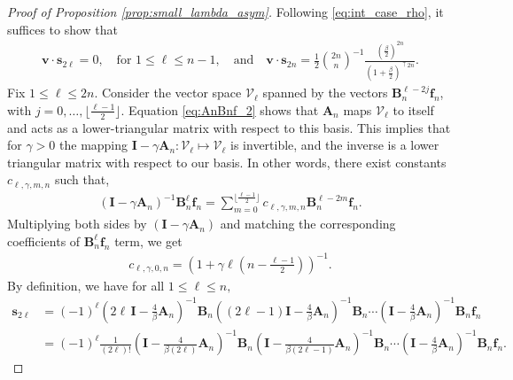 \documentclass[12pt]{article}
\theoremstyle{definition} %
\theoremstyle{remark} %
\begin{document}
\begin{proof}[Proof of Proposition \ref{prop:small_lambda_asym}]
    Following \eqref{eq:int_case_rho}, it suffices to show that
     \begin{align}
         \mathbf{v}\cdot\mathbf{s}_{2\ell}=0,\quad \text{for $1\le \ell\le n-1$},\quad\text{and} \quad 
         \mathbf{v}\cdot\mathbf{s}_{2n}=   \frac12 \binom{2n}{n}^{-1}\frac{\left(\tfrac{\beta}{2}\right)^{2n}}{\left(1+\frac{\beta}{2}\right)^{\uparrow 2n}}.
     \end{align}
Fix $1\le \ell\le 2n$. Consider the vector space $\mathcal{V}_\ell$ spanned by the vectors $\mathbf{B}_n^{\ell-2j}\mathbf{f}_n$, with $j=0,\dots,  \lfloor\frac{\ell-1}{2}\rfloor$.
Equation \eqref{eq:AnBnf_2} shows that $\mathbf{A}_n$ maps $\mathcal{V}_\ell$ to itself and acts as a lower-triangular matrix with respect to this basis. This implies that for $\gamma>0$ the mapping $\mathbf{I}-\gamma \mathbf{A}_n: \mathcal{V}_\ell \mapsto \mathcal{V}_\ell$ is invertible, and the inverse is a lower triangular matrix with respect to our basis. 
In other words, there exist constants $ c_{\ell,\gamma, m, n} $ such that,
\begin{align}
    \label{eq:invBnf}
    (\mathbf{I}-\gamma \mathbf{A}_n)^{-1}   \mathbf{B}^{\ell}_n   \mathbf{f}_n = \sum_{m=0}^{\lfloor \frac{\ell-1}{2} \rfloor} c_{\ell,\gamma, m, n}  \mathbf{B}^{\ell-2m}_n \mathbf{f}_n.
\end{align}
Multiplying both sides by $(\mathbf{I}-\gamma \mathbf{A}_n)$ and matching the corresponding coefficients of $\mathbf{B}_n^{\ell} \mathbf{f}_n$ term, we get
\begin{align} \label{eq:invBnf_coeff}
 c_{\ell,\gamma, 0, n}=(1+ \gamma \ell (n-\tfrac{\ell-1}{2}))^{-1}.   
\end{align}
 By definition, we have for all $1\leq \ell \leq n,$ 
\begin{align*}
    \mathbf{s}_{2\ell} &= (-1)^{\ell} 
(2\ell \,\mathbf{I}-\tfrac{4}{\beta} \mathbf{A}_n)^{-1}\mathbf{B}_n ((2\ell-1) \mathbf{I}-\tfrac{4}{\beta} \mathbf{A}_n)^{-1}\mathbf{B}_n\cdots ( \mathbf{I}-\tfrac{4}{\beta} \mathbf{A}_n)^{-1}\mathbf{B}_n \mathbf{f}_n\\
 &= (-1)^{\ell} \frac{1}{(2\ell)!}
( \mathbf{I}-\tfrac{4}{\beta(2\ell)} \mathbf{A}_n)^{-1}\mathbf{B}_n (\mathbf{I}-\tfrac{4}{\beta (2\ell-1)} \mathbf{A}_n)^{-1}\mathbf{B}_n\cdots ( \mathbf{I}-\tfrac{4}{\beta} \mathbf{A}_n)^{-1}\mathbf{B}_n \mathbf{f}_n.

\end{align*}
\end{proof}
\end{document}
